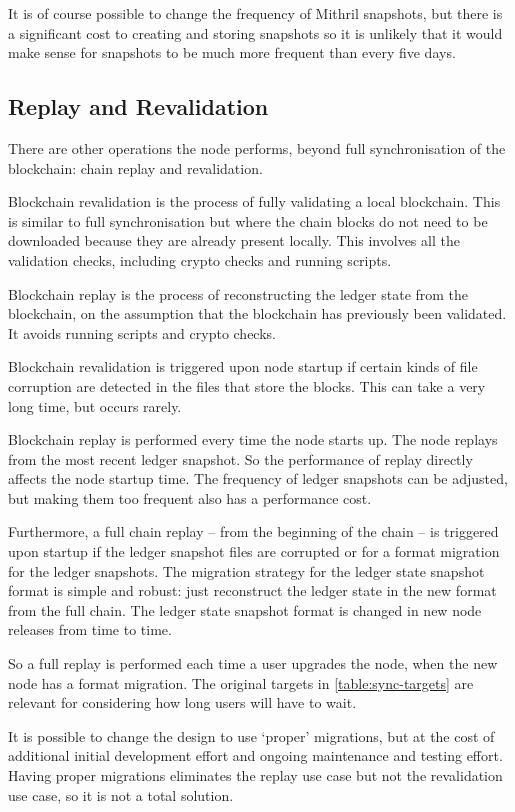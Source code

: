 \documentclass[11pt,a4paper]{article}
\begin{document}
It is of course possible to change the frequency of Mithril snapshots, but
there is a significant cost to creating and storing snapshots so it is unlikely
that it would make sense for snapshots to be much more frequent than every
five days.

\subsection{Replay and Revalidation}

There are other operations the node performs, beyond full synchronisation of
the blockchain: chain replay and revalidation.

Blockchain revalidation is the process of fully validating a local blockchain.
This is similar to full synchronisation but where the chain blocks do not need
to be downloaded because they are already present locally. This involves all
the validation checks, including crypto checks and running scripts.

Blockchain replay is the process of reconstructing the ledger state from the
blockchain, on the assumption that the blockchain has previously been validated.
It avoids running scripts and crypto checks.

Blockchain revalidation is triggered upon node startup if certain kinds of file
corruption are detected in the files that store the blocks. This can take a
very long time, but occurs rarely.

Blockchain replay is performed every time the node starts up. The node replays
from the most recent ledger snapshot. So the performance of replay directly
affects the node startup time. The frequency of ledger snapshots can be
adjusted, but making them too frequent also has a performance cost.

Furthermore, a full chain replay -- from the beginning of the chain -- is
triggered upon startup if the ledger snapshot files are corrupted or for a
format migration for the ledger snapshots. The migration strategy for the
ledger state snapshot format is simple and robust: just reconstruct the ledger
state in the new format from the full chain. The ledger state snapshot format
is changed in new node releases from time to time.

So a full replay is performed each time a user upgrades the node, when the new
node has a format migration. The original targets in \cref{table:sync-targets}
are relevant for considering how long users will have to wait.

It is possible to change the design to use `proper' migrations, but at the cost
of additional initial development effort and ongoing maintenance and testing
effort. Having proper migrations eliminates the replay use case but not the
revalidation use case, so it is not a total solution.
\end{document}
